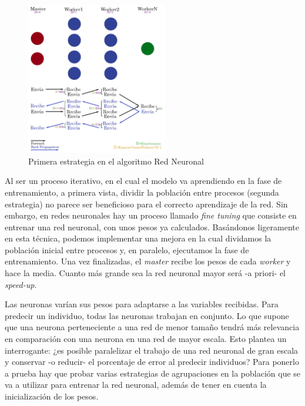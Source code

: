	\begin{figure}[!h]
		\centering
		\includegraphics[width=0.55\textwidth]{images/chapter_3/redneu_mpi2}
		\caption{Primera estrategia en el algoritmo Red Neuronal}
		\label{fig:redneumpipipe}
	\end{figure}
	
	Al ser un proceso iterativo, en el cual el modelo va aprendiendo en la fase de entrenamiento, a primera vista, dividir la población entre procesos (segunda estrategia) no parece ser beneficioso para el correcto aprendizaje de la red. Sin embargo, en redes neuronales hay un proceso llamado \textit{fine tuning} \cite{malladi2023fine} que consiste en entrenar una red neuronal, con unos pesos ya calculados. Basándonos ligeramente en esta técnica, podemos implementar una mejora en la cual dividamos la población inicial entre procesos y, en paralelo, ejecutamos la fase de entrenamiento. Una vez finalizadas, el \textit{master} recibe los pesos de cada \textit{worker} y hace la media. Cuanto más grande sea la red neuronal mayor será -a priori- el \textit{speed-up}.
		
	Las neuronas varían sus pesos para adaptarse a las variables recibidas. Para predecir un individuo, todas las neuronas trabajan en conjunto. Lo que supone que una neurona perteneciente a una red de menor tamaño tendrá más relevancia en comparación con una neurona en una red de mayor escala. Esto plantea un interrogante: ¿es posible paralelizar el trabajo de una red neuronal de gran escala y conservar -o reducir- el porcentaje de error al predecir individuos? Para ponerlo a prueba hay que probar varias estrategias de agrupaciones en la población que se va a utilizar para entrenar la red neuronal, además de tener en cuenta la inicialización de los pesos.
	
